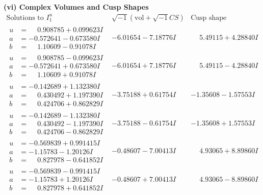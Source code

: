 \documentclass[1p]{elsarticle_modified}
\theoremstyle{definition}
\newcommand{\I}{\sqrt{-1}}
\begin{document}
\newpage\flushleft \textbf{(vi) Complex Volumes and Cusp Shapes}
$$\begin{array}{c|c|c}  
\text{Solutions to }I^u_{1}& \I (\text{vol} + \sqrt{-1}CS) & \text{Cusp shape}\\
 \hline 
\begin{aligned}
u &= \phantom{-}0.908785 + 0.099623 I \\
a &= -0.572641 - 0.673580 I \\
b &= \phantom{-}1.10609 - 0.91078 I\end{aligned}
 & -6.01654 - 7.18776 I & \phantom{-}5.49115 + 4.28840 I \\ \hline\begin{aligned}
u &= \phantom{-}0.908785 - 0.099623 I \\
a &= -0.572641 + 0.673580 I \\
b &= \phantom{-}1.10609 + 0.91078 I\end{aligned}
 & -6.01654 + 7.18776 I & \phantom{-}5.49115 - 4.28840 I \\ \hline\begin{aligned}
u &= -0.142689 + 1.132380 I \\
a &= \phantom{-}0.430492 + 1.197390 I \\
b &= \phantom{-}0.424706 + 0.862829 I\end{aligned}
 & -3.75188 + 0.61754 I & -1.35608 - 1.57553 I \\ \hline\begin{aligned}
u &= -0.142689 - 1.132380 I \\
a &= \phantom{-}0.430492 - 1.197390 I \\
b &= \phantom{-}0.424706 - 0.862829 I\end{aligned}
 & -3.75188 - 0.61754 I & -1.35608 + 1.57553 I \\ \hline\begin{aligned}
u &= -0.569839 + 0.991415 I \\
a &= -1.15783 - 1.20126 I \\
b &= \phantom{-}0.827978 - 0.641852 I\end{aligned}
 & -0.48607 - 7.00413 I & \phantom{-}4.93065 + 8.89860 I \\ \hline\begin{aligned}
u &= -0.569839 - 0.991415 I \\
a &= -1.15783 + 1.20126 I \\
b &= \phantom{-}0.827978 + 0.641852 I\end{aligned}
 & -0.48607 + 7.00413 I & \phantom{-}4.93065 - 8.89860 I \\ \hline\begin{aligned}

\end{aligned}
\end{array}$$
\end{document}
